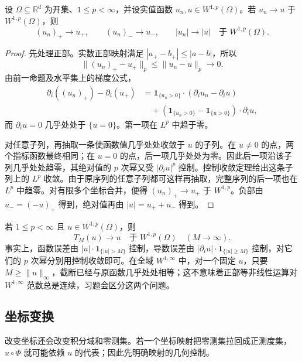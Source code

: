 \begin{proposition}[正负部的强连续性]
\label{b1:prop:sobolev-lattice-strong-continuity}
设 \(\Omega\subseteq\mathbb R^d\) 为开集、\(1\le p<\infty\)，并设实值函数
\(u_n,u\in W^{1,p}(\Omega)\)。若 \(u_n\to u\) 于 \(W^{1,p}(\Omega)\)，则
\[
 (u_n)_+\longrightarrow u_+,\qquad
 (u_n)_-\longrightarrow u_-,\qquad
 |u_n|\longrightarrow |u|
 \quad\text{于 }W^{1,p}(\Omega).
\]
\end{proposition}
\begin{proof}
先处理正部。实数正部映射满足 \(|a_+-b_+|\le|a-b|\)，所以
\[
 \|(u_n)_+-u_+\|_p\le\|u_n-u\|_p\longrightarrow0.
\]
由前一命题及水平集上的梯度公式，
\[
 \begin{aligned}
 \partial_i((u_n)_+)-\partial_i(u_+)
 &=\mathbf1_{\{u_n>0\}}\cdot(\partial_i u_n-\partial_i u)\\
 &\quad+
   (\mathbf1_{\{u_n>0\}}-\mathbf1_{\{u>0\}})\cdot\partial_i u,
 \end{aligned}
\]
而 \(\partial_i u=0\) 几乎处处于 \(\{u=0\}\)。第一项在 \(L^p\) 中趋于零。

对任意子列，再抽取一条使函数值几乎处处收敛于 \(u\) 的子列。在 \(u\ne0\) 的点，两个指标函数最终相同；在 \(u=0\) 的点，后一项几乎处处为零。因此后一项沿该子列几乎处处趋零，其绝对值的 \(p\) 次幂又受 \(|\partial_i u|^p\) 控制。控制收敛定理给出这条子列上的 \(L^p\) 收敛。由于原序列的任意子列都可这样再抽取，完整序列的后一项也在 \(L^p\) 中趋零。对有限多个坐标合并，便得 \((u_n)_+\to u_+\) 于 \(W^{1,p}\)。负部由 \(u_-=(-u)_+\) 得到，绝对值再由 \(|u|=u_++u_-\) 得到。
\end{proof}

若 \(1\le p<\infty\) 且 \(u\in W^{1,p}(\Omega)\)，则
\begin{equation}\label{b1:eq:sobolev-truncation-convergence}
 T_M(u)\longrightarrow u\quad\text{于 }W^{1,p}(\Omega)
 \quad(M\to\infty).
\end{equation}
事实上，函数误差由 \(|u|\cdot\mathbf1_{\{|u|>M\}}\) 控制，导数误差由 \(|\partial_i u|\cdot\mathbf1_{\{|u|\ge M\}}\) 控制，对它们的 \(p\) 次幂分别用控制收敛即可。在全域 \(W^{1,\infty}\) 中，对一个固定 \(u\)，只要 \(M\ge\|u\|_\infty\)，截断已经与原函数几乎处处相等；这不意味着正部等非线性运算对 \(W^{1,\infty}\) 范数总是连续，习题会区分这两个问题。

\subsection{坐标变换}
\label{b1:subsec:210304}

改变坐标还会改变积分域和零测集。若一个坐标映射把零测集拉回成正测度集，\(u\circ\Phi\) 就可能依赖 \(u\) 的代表；因此先明确映射的几何控制。

